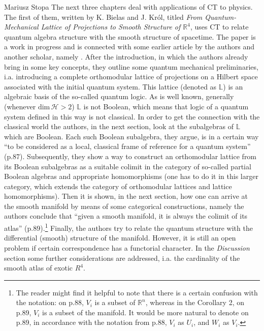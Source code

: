 \begin{recengenv}{Mariusz Stopa}
\enlargethispage{-.5\baselineskip}
The next three chapters deal with applications of CT to physics. The first of them, written by K. Bielas and J. Król, titled \textit{From Quantum-Mechanical Lattice of Projections to Smooth Structure of $ \mathbb{R}^4 $}, uses CT to relate quantum algebra structure with the smooth structure of spacetime. The paper is a work in progress and is connected with some earlier article by the authors and another scholar, namely \textcite{krol-2017}. After the introduction, in which the authors already bring in some key concepts, they outline some quantum mechanical preliminaries, i.a. introducing a complete orthomodular lattice of projections on a Hilbert space associated with the initial quantum system. This lattice (denoted as $ \mathbb{L} $) is an algebraic basis of the so-called quantum logic. As is well known, generally (whenever $\text{dim}\,\mathscr{H}>2$) $ \mathbb{L} $ is not Boolean, which means that logic of a quantum system defined in this way is not classical. In order to get the connection with the classical world the authors, in the next section, look at the subalgebras of $ \mathbb{L} $ which are Boolean. Each such Boolean subalgebra, they argue, is in a certain way ``to be considered as a local, classical frame of reference for a quantum system'' (p.87). Subsequently, they show a way to construct an orthomodular lattice from its Boolean subalgebras as a suitable colimit in the cat\-e\-go\-ry of so-called partial Boolean algebras and appropriate homomorphisms (one has to do it in this larger cat\-e\-go\-ry, which extends the cat\-e\-go\-ry of orthomodular lattices and lattice homomorphisms). Then it is shown, in the next section, how one can arrive at the smooth manifold by means of some cat\-e\-gor\-i\-cal constructions, namely the authors conclude that ``given a smooth manifold, it is always the colimit of its atlas'' (p.89).\footnote{The reader might find it helpful to note that there is a certain confusion with the notation: on p.88, $ V_i $ is a subset of $ \mathbb{R}^n $, whereas in the Corollary 2, on p.89, $ V_i $ is a subset of the manifold. It would be more natural to denote on p.89, in accordance with the notation from p.88, $ V_i $ as $ U_i $, and $ W_i $ as $ V_i $.} Finally, the authors try to relate the quantum structure with the differential (smooth) structure of the manifold. However, it is still an open problem if certain correspondence has a functorial character. In the \textit{Discussion} section some further considerations are addressed, i.a. the cardinality of the smooth atlas of exotic $ R^4 $. 



\end{recengenv}
